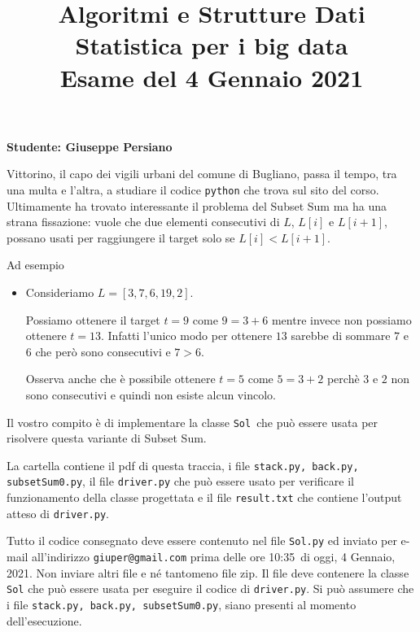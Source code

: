 \documentclass{amsart}
\begin{document}
\title{Algoritmi e Strutture Dati\\
Statistica per i big data\\
Esame del 4 Gennaio 2021
}


\newcommand{\NomeStudente}{Giuseppe Persiano}
\newcommand{\nomeClasse}{{\tt{Sol}}}
\newcommand{\nomeMetodo}{{\tt{Solve}}}
\newcommand{\oraconsegna}{10:35}
\newcommand{\dataoggi}{4 Gennaio, 2021}


\maketitle

\hfill{{\bf Studente: \NomeStudente}}

\smallskip
Vittorino, il capo dei vigili urbani del comune di Bugliano, passa il tempo,
tra una multa e l'altra, a studiare il codice {\tt python} che trova
sul sito del corso. Ultimamente ha trovato interessante il problema 
del Subset Sum ma ha una strana fissazione: 
vuole che due elementi consecutivi di $L$, $L[i]$ e $L[i+1]$,
possano usati per raggiungere il target 
solo se $L[i]<L[i+1]$.

Ad esempio
\begin{itemize}
\item Consideriamo $L=[3,7,6,19,2]$.

\noindent
    Possiamo ottenere il target $t=9$ come $9=3+6$ mentre invece
        non possiamo ottenere $t=13$. Infatti l'unico modo per ottenere
        $13$ sarebbe di sommare $7$ e $6$ che per\`o sono consecutivi 
        e $7>6$.

\noindent
    Osserva anche che \`e possibile ottenere $t=5$ come $5=3+2$ perch\`e
        $3$ e $2$ non sono consecutivi e quindi non esiste alcun vincolo.
\end{itemize}
Il vostro compito \`e di implementare la classe \nomeClasse\ che pu\`o
essere usata per risolvere questa variante di Subset Sum.

\medskip{}
La cartella contiene il pdf di questa traccia, i file
{\tt stack.py, back.py, subsetSum0.py},
il file {\tt driver.py} che pu\`o essere usato
per verificare il funzionamento della classe progettata
e il file  {\tt result.txt} che contiene l'output atteso di {\tt driver.py}.

\medskip{}
Tutto il codice consegnato deve essere contenuto nel file
{\tt \nomeClasse .py} ed inviato per e-mail all'indirizzo
{\tt giuper@gmail.com} prima delle ore \oraconsegna\ di oggi, 
\dataoggi. Non inviare altri file e n\'e tantomeno file zip.
Il file deve contenere la classe {\tt \nomeClasse}  
che pu\`o essere usata per eseguire
il codice di {\tt driver.py}. Si pu\`o assumere che i file
{\tt stack.py, back.py, subsetSum0.py},
siano presenti al momento dell'esecuzione. 
\end{document}
